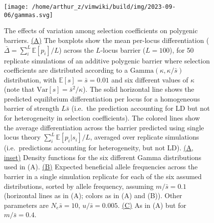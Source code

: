 \documentclass[
  11pt,
]{article}
\begin{document}
\begin{figure}
\hypertarget{fig:gammas}{%
\centering
\texttt{[image: /home/arthur\_z/vimwiki/build/img/2023-09-06/gammas.svg]}
\caption{The effects of variation among selection coefficients on
polygenic barriers. \uline{(A)} The boxplots show the mean per-locus
differentiation (\(\bar{\Delta} = \sum_{i}^L \mathbb{E}[p_i]/L\)) across
the \(L\)-locus barrier (\(L=100\)), for 50 replicate simulations of an
additive polygenic barrier where selection coefficients are distributed
according to a \(\mathrm{Gamma}(\kappa, \kappa/\bar{s})\) distribution,
with \(\mathbb{E}[s] = \bar{s} = 0.01\) and six different values of
\(\kappa\) (note that \(\mathrm{Var}[s] = \bar{s}^2/\kappa\)). The solid
horizontal line shows the predicted equilibrium differentiation per
locus for a homogeneous barrier of strength \(L\bar{s}\) (i.e.~the
prediction accounting for LD but not for heterogeneity in selection
coefficients). The colored lines show the average differentiation across
the barrier predicted using single locus theory
\(\sum_i^L{\mathbb{E}[p_i|s_i]}/L\), averaged over replicate simulations
(i.e.~predictions accounting for heterogeneity, but not LD).
\uline{(A, inset)} Density functions for the six different Gamma
distributions used in (A). \uline{(B)} Expected beneficial allele
frequencies across the barrier in a single simulation replicate for each
of the six assumed distributions, sorted by allele frequency, assuming
\(m/\bar{s} = 0.1\) (horizontal lines as in (A); colors as in (A) and
(B)). Other parameters are \(N_e\bar{s} = 10\), \(u/\bar{s} = 0.005\).
\uline{(C)} As in (A) but for \(m/\bar{s} = 0.4\).}\label{fig:gammas}
}
\end{figure}
\end{document}
